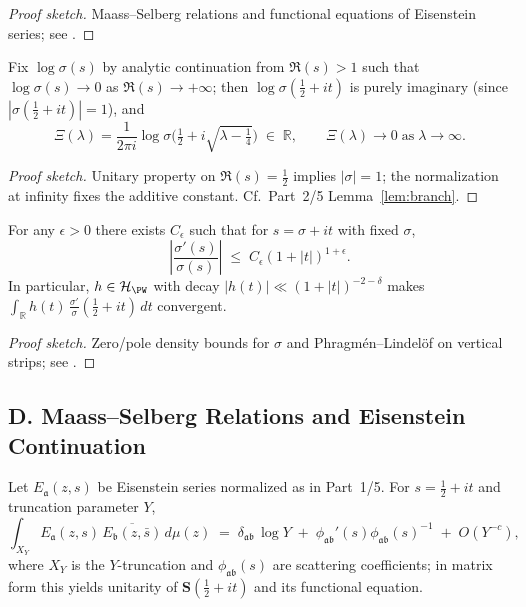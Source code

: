 \begin{proof}[Proof sketch]
Maass–Selberg relations and functional equations of Eisenstein series; see \cite{Hejhal1983II,LaxPhillips1976,Iwaniec2002}.
\end{proof}

\begin{lemma}
\label{lem:branch-4}
Fix $\log\sigma(s)$ by analytic continuation from $\Re(s)>1$ such that $\log\sigma(s)\to0$ as $\Re(s)\to+\infty$; then $\log\sigma(\tfrac12+it)$ is purely imaginary (since $|\sigma(\tfrac12+it)|=1$), and
\[
  \Xi(\lambda)=\frac{1}{2\pi i}\log\sigma\Big(\tfrac12+i\sqrt{\lambda-\tfrac14}\Big)\;\in\;\mathbb R,
  \qquad \Xi(\lambda)\to 0 \;\text{as}\; \lambda\to\infty.
\]
\end{lemma}

\begin{proof}[Proof sketch]
Unitary property on $\Re(s)=\tfrac12$ implies $|\sigma|=1$; the normalization at infinity fixes the additive constant. Cf.\ Part~2/5 Lemma~\ref{lem:branch}. 
\end{proof}

\begin{proposition}
\label{prop:growth-sigma}
For any $\epsilon>0$ there exists $C_\epsilon$ such that for $s=\sigma+it$ with fixed $\sigma$,
\[
  \left|\frac{\sigma'(s)}{\sigma(s)}\right|
  \;\le\; C_\epsilon (1+|t|)^{1+\epsilon}.
\]
In particular, $h\in\mathcal H_{\PW}$ with decay $|h(t)|\ll(1+|t|)^{-2-\delta}$ makes
$\int_\mathbb R h(t)\,\frac{\sigma'}{\sigma}(\tfrac12+it)\,dt$ convergent.
\end{proposition}

\begin{proof}[Proof sketch]
Zero/pole density bounds for $\sigma$ and Phragmén–Lindelöf on vertical strips; see \cite[Ch.~6]{Hejhal1983II}.
\end{proof}


\subsection*{D. Maass–Selberg Relations and Eisenstein Continuation}
\label{subsec:maass-selberg}

\begin{theorem}
\label{thm:maass-selberg}
Let $E_{\mathfrak a}(z,s)$ be Eisenstein series normalized as in Part~1/5. For $s=\tfrac12+it$ and truncation parameter $Y$,
\[
  \int_{X_Y} E_{\mathfrak a}(z,s)\,\overline{E_{\mathfrak b}(z,\bar s)}\,d\mu(z)
  \;=\; \delta_{\mathfrak a\mathfrak b}\,\log Y
  \;+\; \phi_{\mathfrak a\mathfrak b}'(s)\phi_{\mathfrak a\mathfrak b}(s)^{-1}
  \;+\; O(Y^{-c}),
\]
where $X_Y$ is the $Y$-truncation and $\phi_{\mathfrak a\mathfrak b}(s)$ are scattering coefficients; in matrix form this yields unitarity of $\mathbf S(\tfrac12+it)$ and its functional equation.
\end{theorem}

